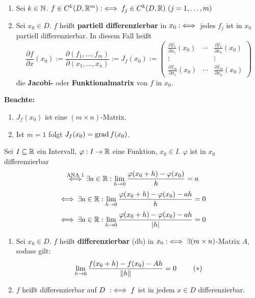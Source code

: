 \documentclass[a4paper,oneside,DIV15,BCOR12mm,chapterprefix=true,headings=onelinechapter]{scrbook}
\begin{document}
\begin{definition*}
\begin{enumerate}
\item Sei $k\in\mathbb{N}$. $f\in C^k(D,\MdR^m) :\equizu f_j\in C^k(D,\MdR)\ (j=1,\ldots,m)$
\item Sei $x_0\in D$. $f$ heißt \textbf{partiell differenzierbar} in $x_0 :\iff$ jedes $f_j$ ist in $x_0$ partiell differenzierbar. In diesem Fall heißt
$$\frac{\partial f}{\partial x}(x_0):=\frac{\partial(f_1,\ldots,f_m)}{\partial(x_1,\ldots,x_n)}:=J_f(x_0):=\begin{pmatrix}
\frac{\partial f_1}{\partial x_1}(x_0) & \cdots & \frac{\partial f_1}{\partial x_n}(x_0) \\
\vdots & & \vdots \\
\frac{\partial f_m}{\partial x_1}(x_0) & \cdots & \frac{\partial f_m}{\partial x_n}(x_0)
\end{pmatrix}$$
die \textbf{Jacobi-} oder \textbf{Funktionalmatrix} von $f$ in $x_0$.
\end{enumerate}
\textbf{Beachte:}
\begin{enumerate}
\item $J_f(x_0)$ ist eine $(m \times n)$-Matrix.
\item Ist $m=1$ folgt $J_f(x_0)=\mathop{\rm grad}\nolimits f(x_0)$.
\end{enumerate}
\end{definition*}

\begin{erinnerung}
Sei $I\subseteq\mathbb{R}$ ein Intervall, $\varphi:I\to\mathbb{R}$ eine Funktion, $x_0\in I$. $\varphi$ ist in $x_0$ differenzierbar
$$\overset{\text{ANA 1}}{\iff}\exists a \in\mathbb{R}: \displaystyle\lim_{h\to 0}\frac{\varphi(x_0+h)-\varphi(x_0)}{h}=a$$
$$\iff\exists a\in\mathbb{R}:\displaystyle\lim_{h\to 0}\frac{\varphi(x_0+h)-\varphi(x_0)-ah}{h}=0$$
$$\iff\exists a\in\mathbb{R}: \displaystyle\lim_{h\to 0}\frac{\varphi(x_0+h)-\varphi(x_0)-ah}{|h|}=0$$
\end{erinnerung}

\begin{definition*}
\begin{enumerate}
    \item Sei $x_0\in D$. $f$ heißt \textbf{differenzierbar} (db) in 
          $x_0 :\iff \exists (m \times n)$-Matrix $A$, sodass gilt:
          \begin{align*}
            \ds\lim_{h\to 0}\frac{f(x_0+h)-f(x_0)-Ah}{\|h\|}=0\ \tag{$*$}
          \end{align*}
    \item $f$ heißt differenzierbar auf $D\ :\iff f$ ist in 
          jedem $x\in D$ differenzierbar.
\end{enumerate}
\end{definition*}
\end{document}
